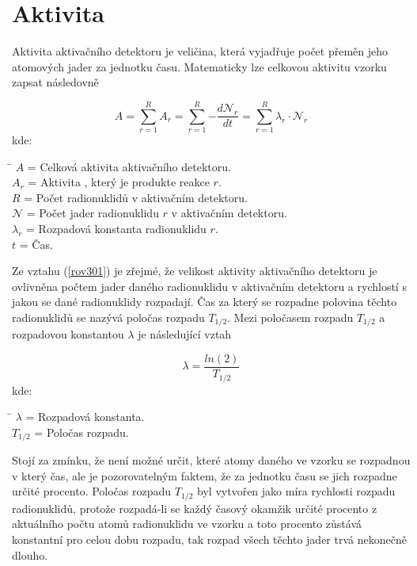 \section{Aktivita}
\label{kap_aktivita}
Aktivita aktivačního detektoru je veličina, která vyjadřuje počet přeměn jeho atomových jader za jednotku času. Matematicky lze celkovou aktivitu vzorku zapsat následovně

\begin{equation}
    \label{rov301}
    A = \sum_{r=1}^{R}{A_{r}} = \sum_{r=1}^{R}{- \frac{d\mathcal{N}_{r}}{dt}} = \sum_{r=1}^{R}{\lambda_{r} \cdot \mathcal{N}_{r}}
\end{equation}
kde:
\begin{tabbing}
    \hspace{0.75cm} \= \kill
    $A$\> = Celková aktivita aktivačního detektoru. \\
    $A_{r}$\> = Aktivita , který je produkte reakce $r$. \\
    $R$\> = Počet radionuklidů v aktivačním detektoru. \\
    $\mathcal{N}$\> = Počet jader radionuklidu $r$ v aktivačním detektoru. \\
    $\lambda_{r}$\> = Rozpadová konstanta radionuklidu $r$. \\
    $t$\> = Čas. \\
\end{tabbing}

Ze vztahu (\ref{rov301}) je zřejmé, že velikost aktivity aktivačního detektoru je ovlivněna počtem jader daného radionuklidu v aktivačním detektoru a rychlostí s jakou se dané radionuklidy rozpadají. Čas za který se rozpadne polovina těchto radionuklidů se nazývá poločas rozpadu $T_{1/2}$. Mezi poločasem rozpadu $T_{1/2}$ a rozpadovou konstantou $\lambda$ je následující vztah

\begin{equation}
    \label{rov302}
    \lambda = \frac{ln(2)}{T_{1/2}}
\end{equation}
kde:
\begin{tabbing}
    \hspace{0.75cm} \= \kill
    $\lambda$\> = Rozpadová konstanta. \\
    $T_{1/2}$\> = Poločas rozpadu. \\
\end{tabbing}

Stojí za zmínku, že není možné určit, které atomy daného  ve vzorku se rozpadnou v který čas, ale je pozorovatelným faktem, že za jednotku času se jich rozpadne určité procento. Poločas rozpadu $T_{1/2}$ byl vytvořen jako míra rychlosti rozpadu radionuklidů, protože rozpadá-li se každý časový okamžik určité procento z aktuálního počtu atomů radionuklidu ve vzorku a toto procento zůstává konstantní pro celou dobu rozpadu, tak rozpad všech těchto jader trvá nekonečně dlouho. 

